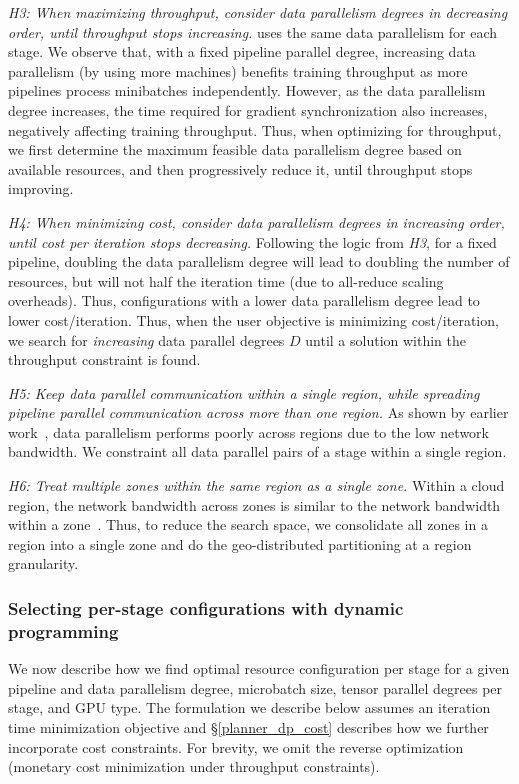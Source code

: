 \textit{H3: When maximizing throughput, consider data parallelism degrees in decreasing order, until throughput stops increasing.} \sailor uses the same data parallelism for each stage.  We observe that, with a fixed pipeline parallel degree, increasing data parallelism (by using more machines) benefits training throughput as more pipelines process minibatches independently. However, as the data parallelism degree increases, the time required for gradient synchronization also increases, negatively affecting training throughput. Thus, when optimizing for throughput, we first determine the maximum feasible data parallelism degree based on available resources, and then progressively reduce it, until throughput stops improving.

\textit{H4: When minimizing cost, consider data parallelism degrees in increasing order, until cost per iteration stops decreasing.} Following the logic from \textit{H3}, for a fixed pipeline, doubling the data parallelism degree will lead to doubling the number of resources, but will not half the iteration time (due to all-reduce scaling overheads). Thus, configurations with a lower data parallelism degree lead to lower cost/iteration. Thus, when the user objective is minimizing cost/iteration, we search for \textit{increasing} data parallel degrees $D$ until a solution within the throughput constraint is found.

\textit{H5: Keep data parallel communication within a single region, while spreading pipeline parallel communication across more than one region.} As shown by earlier work~\cite{strati24crossregion, palak2024atlas}, data parallelism performs poorly across regions due to the low network bandwidth. We constraint all data parallel pairs of a stage within a single region.

\textit{H6: Treat multiple zones within the same region as a single zone.} Within a cloud region, the network bandwidth across zones is  similar to the network bandwidth within a zone~\cite{strati24crossregion}. Thus, to reduce the search space, we consolidate all zones in a region into a single zone and do the geo-distributed partitioning at a region granularity.

\subsubsection{Selecting per-stage configurations with dynamic programming}\label{planner_dp}
We now describe how we find optimal resource configuration per stage for a given pipeline and data parallelism degree, microbatch size, tensor parallel degrees per stage, and GPU type. The formulation we describe below assumes an iteration time minimization objective and \S\ref{planner_dp_cost} describes how we further incorporate cost constraints. For brevity, we omit the reverse optimization (monetary cost minimization under throughput constraints).

